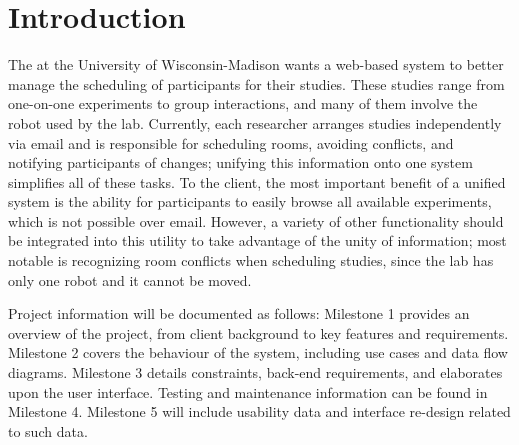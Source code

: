 \section{Introduction}
The  at the University of Wisconsin-Madison wants a web-based system to better manage the scheduling of participants for their studies.  These studies range from one-on-one experiments to group interactions, and many of them involve the robot used by the lab.  Currently, each researcher arranges studies independently via email and is responsible for scheduling rooms, avoiding conflicts, and notifying participants of changes; unifying this information onto one system simplifies all of these tasks.  To the client, the most important benefit of a unified system is the ability for participants to easily browse all available experiments, which is not possible over email.  However, a variety of other functionality should be integrated into this utility to take advantage of the unity of information; most notable is recognizing room conflicts when scheduling studies, since the lab has only one robot and it cannot be moved.\cite{website:HCI}

Project information will be documented as follows:  Milestone 1 provides an overview of the project, from client background to key features and requirements.  Milestone 2 covers the behaviour of the system, including use cases and data flow diagrams.  Milestone 3 details constraints, back-end requirements, and elaborates upon the user interface.  Testing and maintenance information can be found in Milestone 4.  Milestone 5 will include usability data and interface re-design related to such data.